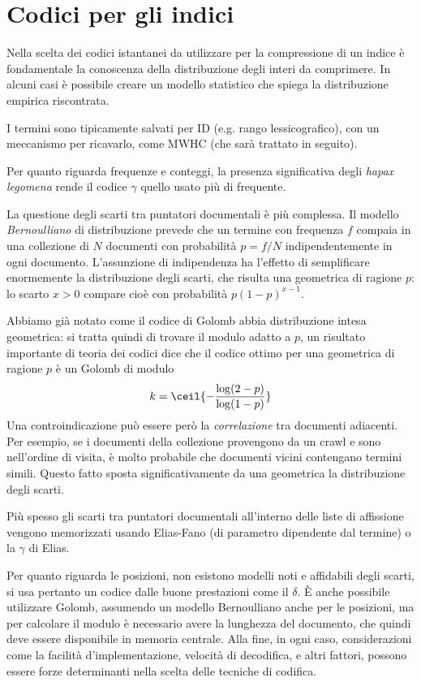 \section{Codici per gli indici}
Nella scelta dei codici istantanei da utilizzare per la compressione di un indice è fondamentale la conoscenza della distribuzione degli interi da comprimere. In alcuni casi è possibile creare un modello statistico che spiega la distribuzione empirica riscontrata.

I termini sono tipicamente salvati per ID (e.g. rango lessicografico), con un meccanismo per ricavarlo, come MWHC (che sarà trattato in seguito).

Per quanto riguarda frequenze e conteggi, la presenza significativa degli \textit{hapax legomena} rende il codice $\gamma$ quello usato più di frequente.

La questione degli scarti tra puntatori documentali è più complessa. Il modello \textit{Bernoulliano} di distribuzione prevede che un termine con frequenza $f$ compaia in una collezione di $N$ documenti con probabilità $p = f / N$ indipendentemente in ogni documento. L'assunzione di indipendenza ha l'effetto di semplificare enormemente la distribuzione degli scarti, che risulta una geometrica di ragione $p$: lo scarto $x > 0$ compare cioè con probabilità $p(1 - p)^{x - 1}$.

Abbiamo già notato come il codice di Golomb abbia distribuzione intesa geometrica: si tratta quindi di trovare il modulo adatto a $p$, un risultato importante di teoria dei codici dice che il codice ottimo per una geometrica di ragione $p$ è un Golomb di modulo
\begin{equation}
    k = \ceil{- \frac{\log(2 - p)}{\log(1 - p)}}
\end{equation}
Una controindicazione può essere però la \textit{correlazione} tra documenti adiacenti. Per esempio, se i documenti della collezione provengono da un crawl e sono nell'ordine di visita, è molto probabile che documenti vicini contengano termini simili. Questo fatto sposta significativamente da una geometrica la distribuzione degli scarti.

Più spesso gli scarti tra puntatori documentali all'interno delle liste di affissione vengono memorizzati usando Elias-Fano (di parametro dipendente dal termine) o la $\gamma$ di Elias.

Per quanto riguarda le posizioni, non esistono modelli noti e affidabili degli scarti, si usa pertanto un codice dalle buone prestazioni come il $\delta$. È anche possibile utilizzare Golomb, assumendo un modello Bernoulliano anche per le posizioni, ma per calcolare il modulo è necessario avere la lunghezza del documento, che quindi deve essere disponibile in memoria centrale. Alla fine, in ogni caso, considerazioni come la facilità d'implementazione, velocità di decodifica, e altri fattori, possono essere forze determinanti nella scelta delle tecniche di codifica.

